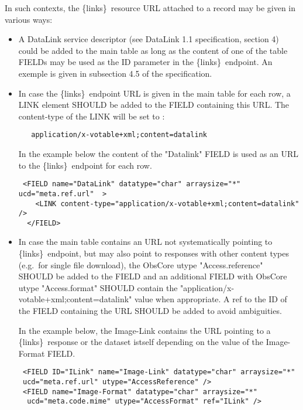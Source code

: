 \documentclass[11pt,a4paper]{ivoa}
\newcommand{\blinks}{\{links\}}
\begin{document}
 In such contexts,  the \blinks\ resource URL attached to a record  may be given in various 
 ways: 
\begin{itemize}
\item A DataLink service descriptor (see DataLink 1.1 specification, section 4) could be added 
to the main table as long as the content of one of the table FIELDs may be used as the ID 
parameter in the \blinks\ endpoint. An exemple is given in subsection 4.5 of the specification.

\item In case the \blinks\ endpoint URL is given in the main table for each row, a LINK 
element SHOULD be added to the FIELD containing this URL. The content-type of the LINK will 
be set to : 
\begin{verbatim}
   application/x-votable+xml;content=datalink
\end{verbatim}
 In the  example below the content of the "Datalink" FIELD is used as an URL to the 
\blinks\ endpoint for each row.
 \begin{verbatim}
 <FIELD name="DataLink" datatype="char" arraysize="*" ucd="meta.ref.url"  >
    <LINK content-type="application/x-votable+xml;content=datalink"  />
  </FIELD>  
\end{verbatim}

\item In case the main table contains an URL  not systematically pointing to \blinks\ 
endpoint, but may also point to  responses with other content types
(e.g.\ for single file download), the ObsCore utype "Access.reference" SHOULD be 
added to the FIELD and an additional FIELD with ObsCore utype "Access.format" SHOULD 
contain the "application/x-votable+xml;content=datalink" value when appropriate. 
A ref to the ID of the FIELD containing the URL SHOULD be added to avoid ambiguities.  

In the  example below, the Image-Link contains the URL pointing to a \blinks\ response or
the dataset istself depending on the value of the Image-Format FIELD. 
 \begin{verbatim}
 <FIELD ID="ILink" name="Image-Link" datatype="char" arraysize="*" 
 ucd="meta.ref.url" utype="AccessReference" />
 <FIELD name="Image-Format" datatype="char" arraysize="*"
  ucd="meta.code.mime" utype="AccessFormat" ref="ILink" />
\end{verbatim}


\end{itemize}
\end{document}
